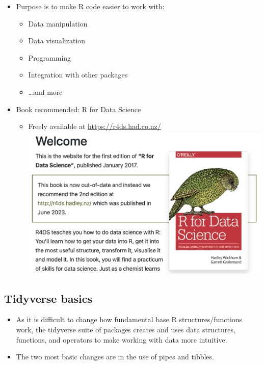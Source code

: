 \documentclass[
]{book}
\providecommand{\tightlist}{%
  \setlength{\itemsep}{0pt}\setlength{\parskip}{0pt}}
\begin{document}
\begin{itemize}
\tightlist
\item
  Purpose is to make R code easier to work with:

  \begin{itemize}
  \tightlist
  \item
    Data manipulation
  \item
    Data visualization
  \item
    Programming
  \item
    Integration with other packages
  \item
    \ldots and more
  \end{itemize}
\item
  Book recommended: R for Data Science

  \begin{itemize}
  \tightlist
  \item
    Freely available at \url{https://r4ds.had.co.nz/}
    \includegraphics{./img/RforDS.png}
  \end{itemize}
\end{itemize}

\subsection{Tidyverse basics}\label{tidyverse-basics}

\begin{itemize}
\tightlist
\item
  As it is difficult to change how fundamental base R structures/functions work, the tidyverse suite of packages creates and uses data structures, functions, and operators to make working with data more intuitive.
\item
  The two most basic changes are in the use of pipes and tibbles.
\end{itemize}
\end{document}
